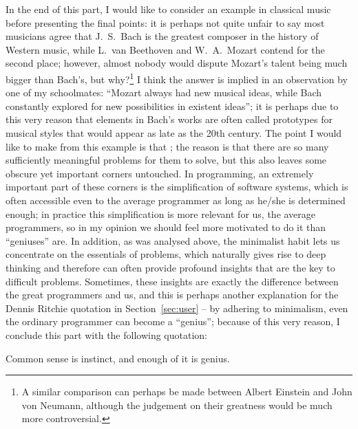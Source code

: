 In the end of this part, I would like to consider an example in classical
music before presenting the final points: it is perhaps not quite unfair
to say most musicians agree that J.~S.\ Bach is the greatest composer in
the history of Western music, while L.\ van Beethoven and W.~A.\ Mozart
contend for the second place; however, almost nobody would dispute Mozart's
talent being much bigger than Bach's, but why?\footnote{A similar comparison
can perhaps be made between Albert Einstein and John von Neumann, although the
judgement on their greatness would be much more controversial.}  I think the
answer is implied in an observation by one of my schoolmates: ``Mozart always
had new musical ideas, while Bach constantly explored for new possibilities in
existent ideas''; it is perhaps due to this very reason that elements in Bach's
works are often called prototypes for musical styles that would appear as late
as the 20th century.  The point I would like to make from this example is
that ; the reason is that
there are so many sufficiently meaningful problems for them to solve, but this
also leaves some obscure yet important corners untouched.  In programming, an
extremely important part of these corners is the simplification of software
systems, which is often accessible even to the average programmer as long as
he/she is determined enough; in practice this simplification is more relevant
for us, the average programmers, so in my opinion we should feel more
motivated to do it than ``geniuses'' are.  In addition, as was analysed
above, the minimalist habit lets us concentrate on the essentials of problems,
which naturally gives rise to deep thinking and therefore can often provide
profound insights that are the key to difficult problems.  Sometimes, these
insights are exactly the difference between the great programmers and us,
and this is perhaps another explanation for the Dennis Ritchie quotation
in Section~\ref{sec:user} -- by adhering to minimalism, even the
ordinary programmer can become a ``genius''; because of this very
reason, I conclude this part with the following quotation:
\begin{quoting}
	Common sense is instinct, and enough of it is genius.
\end{quoting}

